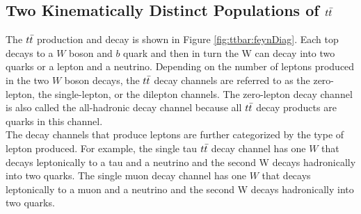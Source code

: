 \subsection{Two Kinematically Distinct Populations of $t\bar{t}$}
\label{sec:Bkg:ttbar:Pop}


\indent The $t\bar{t}$ production and decay is shown in Figure \ref{fig:ttbar:feynDiag}.  Each top decays to a $W$ boson and $b$ quark and then in turn the W can decay into two quarks or a lepton and a neutrino. Depending on the number of leptons produced in the two $W$ boson decays, the $t\bar{t}$ decay channels are referred to as the zero-lepton, the single-lepton, or the dilepton channels.  The zero-lepton decay channel is also called the all-hadronic decay channel because all $t\bar{t}$ decay products are quarks in this channel.  \\

\indent The decay channels that produce leptons are further categorized by the type of lepton produced.  For example, the single tau $t\bar{t}$ decay channel has one $W$ that decays leptonically to a tau and a neutrino and the second W decays hadronically into two quarks.  The single muon decay channel has one $W$ that decays leptonically to a muon and a neutrino and the second W decays hadronically into two quarks.  \\

